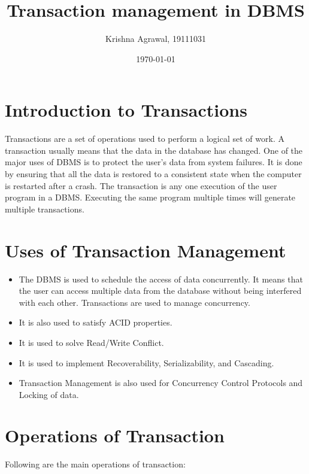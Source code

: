 \documentclass{article}
\title{Transaction management in DBMS}
\author{Krishna Agrawal, 19111031}
\date{\today}
\begin{document}
\maketitle


\section{Introduction to Transactions}

Transactions are a set of operations used to perform a logical set of work. A transaction usually means that the data in the database has changed. One of the major uses of DBMS is to protect the user’s data from system failures. It is done by ensuring that all the data is restored to a consistent state when the computer is restarted after a crash. The transaction is any one execution of the user program in a DBMS. Executing the same program multiple times will generate multiple transactions.\\

\section{Uses of Transaction Management} 

\begin{itemize}
\item The DBMS is used to schedule the access of data concurrently. It means that the user can access multiple data from the database without being interfered with each other. Transactions are used to manage concurrency.
\item It is also used to satisfy ACID properties.
\item It is used to solve Read/Write Conflict.
\item It is used to implement Recoverability, Serializability, and Cascading.
\item Transaction Management is also used for Concurrency Control Protocols and Locking of data.
\end{itemize}

\section{Operations of Transaction}

Following are the main operations of transaction:
\end{document}
